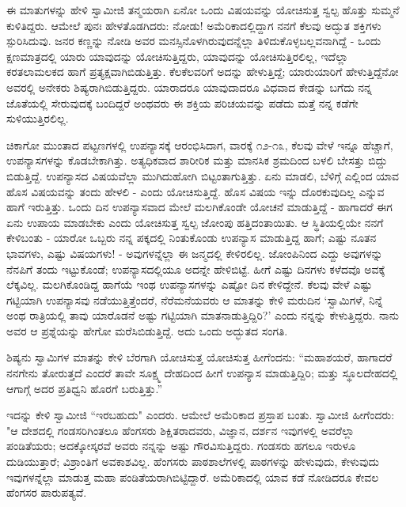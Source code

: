ಈ ಮಾತುಗಳನ್ನು ಹೇಳಿ ಸ್ವಾಮೀಜಿ ತನ್ಮಯರಾಗಿ ಏನೋ ಒಂದು ವಿಷಯವನ್ನು ಯೋಚಿಸುತ್ತ ಸ್ವಲ್ಪ ಹೊತ್ತು ಸುಮ್ಮನೆ ಕುಳಿತಿದ್ದರು. ಆಮೇಲೆ ಪುನಃ ಹೇಳತೊಡಗಿದರು: ನೋಡು! ಅಮೆರಿಕಾದಲ್ಲಿದ್ದಾಗ ನನಗೆ ಕೆಲವು ಅದ್ಭುತ ಶಕ್ತಿಗಳು ಸ್ಪುರಿಸಿದುವು. ಜನರ ಕಣ್ಣನ್ನು ನೋಡಿ ಅವರ ಮನಸ್ಸಿನೊಳಗಿರುವುದನ್ನೆಲ್ಲಾ ತಿಳಿದುಕೊಳ್ಳಬಲ್ಲವನಾಗಿದ್ದೆ - ಒಂದು ಕ್ಷಣಮಾತ್ರದಲ್ಲಿ ಯಾರು ಯಾವುದನ್ನು ಯೋಚಿಸುತ್ತಿದ್ದರು, ಯಾವುದನ್ನು ಯೋಚಿಸುತ್ತಿರಲಿಲ್ಲ, ಇದೆಲ್ಲಾ ಕರತಲಾಮಲಕದ ಹಾಗೆ ಪ್ರತ್ಯಕ್ಷವಾಗಿಬಿಡುತ್ತಿತ್ತು. ಕೆಲಕೆಲವರಿಗೆ ಅದನ್ನು ಹೇಳುತ್ತಿದ್ದೆ; ಯಾರುಯಾರಿಗೆ ಹೇಳುತ್ತಿದ್ದೆನೋ ಅವರಲ್ಲಿ ಅನೇಕರು ಶಿಷ್ಯರಾಗಿಬಿಡುತ್ತಿದ್ದರು. ಯಾರಾದರೂ ಯಾವುದಾದರೂ ವಿಧವಾದ ಕೇಡನ್ನು ಬಗೆದು ನನ್ನ ಜೊತೆಯಲ್ಲಿ ಸೇರುವುದಕ್ಕೆ ಬಂದಿದ್ದರೆ ಅಂಥವರು ಈ ಶಕ್ತಿಯ ಪರಿಚಯವನ್ನು ಪಡೆದು ಮತ್ತೆ ನನ್ನ ಕಡೆಗೇ ಸುಳಿಯುತ್ತಿರಲಿಲ್ಲ.

ಚಿಕಾಗೋ ಮುಂತಾದ ಪಟ್ಟಣಗಳಲ್ಲಿ ಉಪನ್ಯಾಸಕ್ಕೆ ಆರಂಭಿಸಿದಾಗ, ವಾರಕ್ಕೆ ೧೨-೧೩, ಕೆಲವು ವೇಳೆ ಇನ್ನೂ ಹೆಚ್ಚಾಗೆ, ಉಪನ್ಯಾಸಗಳನ್ನು ಕೊಡಬೇಕಾಗಿತ್ತು. ಅತ್ಯಧಿಕವಾದ ಶಾರೀರಿಕ ಮತ್ತು ಮಾನಸಿಕ ಶ್ರಮದಿಂದ ಬಳಲಿ ಬೇಸತ್ತು ಬಿದ್ದು ಬಿಡುತ್ತಿದ್ದೆ. ಉಪನ್ಯಾಸದ ವಿಷಯವೆಲ್ಲಾ ಮುಗಿದುಹೋಗಿ ಬಿಟ್ಟಂತಾಗುತ್ತಿತ್ತು. ಏನು ಮಾಡಲಿ, ಬೆಳಿಗ್ಗೆ ಎಲ್ಲಿಂದ ಯಾವ ಹೊಸ ವಿಷಯವನ್ನು ತಂದು ಹೇಳಲಿ - ಎಂದು ಯೋಚಿಸುತ್ತಿದ್ದೆ. ಹೊಸ ವಿಷಯ ಇನ್ನು ದೊರಕುವುದಿಲ್ಲ ಎನ್ನುವ ಹಾಗೆ ಇರುತ್ತಿತ್ತು. ಒಂದು ದಿನ ಉಪನ್ಯಾಸವಾದ ಮೇಲೆ ಮಲಗಿಕೊಂಡೇ ಯೋಚನೆ ಮಾಡುತ್ತಿದ್ದೆ - ಹಾಗಾದರೆ ಈಗ ಏನು ಉಪಾಯ ಮಾಡಬೇಕು ಎಂದು ಯೋಚಿಸುತ್ತ ಸ್ವಲ್ಪ ಜೋಂಪು ಹತ್ತಿದಂತಾಯಿತು. ಆ ಸ್ಥಿತಿಯಲ್ಲಿಯೇ ನನಗೆ ಕೇಳಿಬಂತು - ಯಾರೋ ಒಬ್ಬರು ನನ್ನ ಪಕ್ಕದಲ್ಲಿ ನಿಂತುಕೊಂಡು ಉಪನ್ಯಾಸ ಮಾಡುತ್ತಿದ್ದ ಹಾಗೆ; ಎಷ್ಟು ನೂತನ ಭಾವಗಳು, ಎಷ್ಟು ವಿಷಯಗಳು! - ಅವುಗಳನ್ನೆಲ್ಲಾ ಈ ಜನ್ಮದಲ್ಲಿ ಕೇಳಿರಲಿಲ್ಲ. ಜೋಂಪಿನಿಂದ ಎದ್ದು ಅವುಗಳನ್ನು ನೆನಪಿಗೆ ತಂದು ಇಟ್ಟುಕೊಂಡೆ; ಉಪನ್ಯಾಸದಲ್ಲಿಯೂ ಅದನ್ನೇ ಹೇಳಿಬಿಟ್ಟೆ. ಹೀಗೆ ಎಷ್ಟು ದಿನಗಳು ಕಳೆದವೊ ಅವಕ್ಕೆ ಲೆಕ್ಕವಿಲ್ಲ. ಮಲಗಿಕೊಂಡಿದ್ದ ಹಾಗೆಯೆ ಇಂಥ ಉಪನ್ಯಾಸಗಳನ್ನು ಎಷ್ಟೋ ದಿನ ಕೇಳಿದ್ದೇನೆ. ಕೆಲವು ವೇಳೆ ಎಷ್ಟು ಗಟ್ಟಿಯಾಗಿ ಉಪನ್ಯಾಸವು ನಡೆಯುತ್ತಿತ್ತೆಂದರೆ, ನೆರೆಮನೆಯವರು ಆ ಮಾತನ್ನು ಕೇಳಿ ಮರುದಿನ ‘ಸ್ವಾಮಿಗಳೆ, ನಿನ್ನೆ ಅಂಥ ರಾತ್ರಿಯಲ್ಲಿ ತಾವು ಯಾರೊಡನೆ ಅಷ್ಟು ಗಟ್ಟಿಯಾಗಿ ಮಾತನಾಡುತ್ತಿದ್ದಿರಿ?’ ಎಂದು ನನ್ನನ್ನು ಕೇಳುತ್ತಿದ್ದರು. ನಾನು ಅವರ ಆ ಪ್ರಶ್ನೆಯನ್ನು ಹೇಗೋ ಮರೆಸಿಬಿಡುತ್ತಿದ್ದೆ. ಅದು ಒಂದು ಅದ್ಭುತದ ಸಂಗತಿ.

ಶಿಷ್ಯನು ಸ್ವಾಮಿಗಳ ಮಾತನ್ನು ಕೇಳಿ ಬೆರಗಾಗಿ ಯೋಚಿಸುತ್ತ ಯೋಚಿಸುತ್ತ ಹೀಗೆಂದನು: “ಮಹಾಶಯರೆ, ಹಾಗಾದರೆ ನನಗೇನು ತೋರುತ್ತದೆ ಎಂದರೆ ತಾವೇ ಸೂಕ್ಷ್ಮ ದೇಹದಿಂದ ಹೀಗೆ ಉಪನ್ಯಾಸ ಮಾಡುತ್ತಿದ್ದಿರಿ; ಮತ್ತು ಸ್ಥೂಲದೇಹದಲ್ಲಿ ಆಗಾಗ್ಗೆ ಅದರ ಪ್ರತಿಧ್ವನಿ ಹೊರಗೆ ಬರುತ್ತಿತ್ತು.”

ಇದನ್ನು ಕೇಳಿ ಸ್ವಾಮೀಜಿ “ಇರಬಹುದು" ಎಂದರು. ಆಮೇಲೆ ಅಮೆರಿಕಾದ ಪ್ರಸ್ತಾಪ ಬಂತು. ಸ್ವಾಮೀಜಿ ಹೀಗೆಂದರು: "ಆ ದೇಶದಲ್ಲಿ ಗಂಡಸರಿಗಿಂತಲೂ ಹೆಂಗಸರು ಶಿಕ್ಷಿತರಾದವರು, ವಿಜ್ಞಾನ, ದರ್ಶನ ಇವುಗಳಲ್ಲಿ ಅವರೆಲ್ಲಾ ಪಂಡಿತೆಯರು; ಅದಕ್ಕೋಸ್ಕರವೆ ಅವರು ನನ್ನನ್ನು ಅಷ್ಟು ಗೌರವಿಸುತ್ತಿದ್ದರು. ಗಂಡಸರು ಹಗಲೂ ಇರುಳೂ ದುಡಿಯುತ್ತಾರೆ; ವಿಶ್ರಾಂತಿಗೆ ಅವಕಾಶವಿಲ್ಲ. ಹೆಂಗಸರು ಪಾಠಶಾಲೆಗಳಲ್ಲಿ ಪಾಠಗಳನ್ನು ಹೇಳುವುದು, ಕೇಳುವುದು ಇವುಗಳನ್ನೆಲ್ಲಾ ಮಾಡುತ್ತ ಮಹಾ ಪಂಡಿತೆಯರಾಗಿಬಿಟ್ಟಿದ್ದಾರೆ. ಅಮೆರಿಕಾದಲ್ಲಿ ಯಾವ ಕಡೆ ನೋಡಿದರೂ ಕೇವಲ ಹೆಂಗಸರ ಪಾರುಪತ್ಯವೆ.

